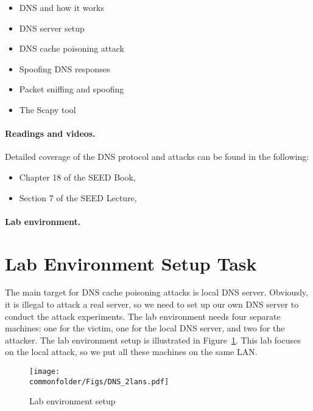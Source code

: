 \begin{itemize}[noitemsep]
\item DNS and how it works
\item DNS server setup
\item DNS cache poisoning attack
\item Spoofing DNS responses
\item Packet sniffing and spoofing
\item The Scapy tool
\end{itemize}


\paragraph{Readings and videos.}
Detailed coverage of the DNS protocol and attacks can be found in the following:

\begin{itemize}
\item Chapter 18 of the SEED Book, \seedbook
\item Section 7 of the SEED Lecture, \seedisvideo
\end{itemize}



\paragraph{Lab environment.} \seedenvironmentB





\section{Lab Environment Setup Task}
\label{sec:environment}


The main target for DNS cache poisoning attacks is
local DNS server.  Obviously, it
is illegal to attack a real server, so we need to set up our own DNS
server to  conduct the attack experiments. The lab
environment needs four separate machines:
one for the victim, one for the local DNS server, and two for the attacker.
The lab environment setup is illustrated in Figure~\ref{dns:fig:environment}.
This lab focuses on the local attack, so we put all these machines on 
the same LAN.



\begin{figure}[htb]
\centering
\texttt{[image: \\commonfolder/Figs/DNS\_2lans.pdf]}
\caption{Lab environment setup}
\label{dns:fig:environment}
\end{figure}


